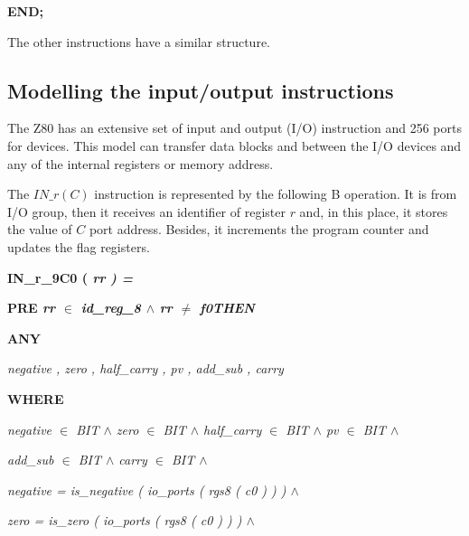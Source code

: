 \documentclass[11pt]{article} %
\newcommand{\footnoterecall}[1]{
  \footnotemark[\value{#1}]
}
\begin{document}
\hspace*{0.00in}\bf END\rm ;

The other instructions have a similar structure.

\subsection{Modelling the input/output instructions}

The Z80 has an extensive set of input and output (I/O) instruction and 256 ports for
devices. This model can transfer data blocks and between the I/O devices and any
of the internal registers or memory address.

The $\mathit{IN\_r(C)}$\footnoterecall{myfootnote} instruction is represented
by the following B operation. It is from I/O group, then it receives an
identifier of register $\mathit{r}$ and, in this place, it stores the value of $\mathit{C}$ port address. Besides, it increments the
program counter and updates the flag registers.

\hspace*{0.0in}\bf IN\_r\_9C0 \rm ( \it rr \rm ) \rm =

\hspace*{0.0in}\bf PRE \it rr  $\in$  \it id\_reg\_8  $\land$  \it rr  $\not =$  \it f0\hspace*{0.15in}\bf THEN

\hspace*{0.20in}\bf ANY

\hspace*{0.40in}\it negative \rm , \it zero \rm , \it half\_carry \rm , \it pv \rm , \it add\_sub \rm , \it carry

\hspace*{0.20in}\bf WHERE 

\hspace*{0.40in}\it negative $\in$ \it BIT $\land$ \it zero $\in$ \it BIT $\land$ \it half\_carry $\in$ \it BIT 
$\land$ \it pv $\in$ \it BIT $\land$

 \hspace*{0.40in}\it add\_sub $\in$ \it BIT $\land$ \it carry $\in$ \it BIT  $\land$

\hspace*{0.40in}\it negative \rm = \it is\_negative \rm ( \it io\_ports \rm ( \it rgs8 \rm ( \it c0 \rm ) \rm ) \rm )  $\land$ 

\hspace*{0.40in}\it zero \rm = \it is\_zero \rm ( \it io\_ports \rm ( \it rgs8 \rm ( \it c0 \rm ) \rm ) \rm )  $\land$ 
\end{document}
